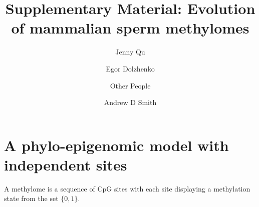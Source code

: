 \documentclass[11pt]{article}
\title{Supplementary Material: Evolution of mammalian sperm methylomes}
\date{}
\author{Jenny Qu \and Egor Dolzhenko \and Other People \and Andrew D Smith}
\begin{document}


















\section{A phylo-epigenomic model with independent sites}

A methylome is a sequence of CpG sites with each site displaying a
methylation state from the set $\{0,1\}$.
\end{document}
